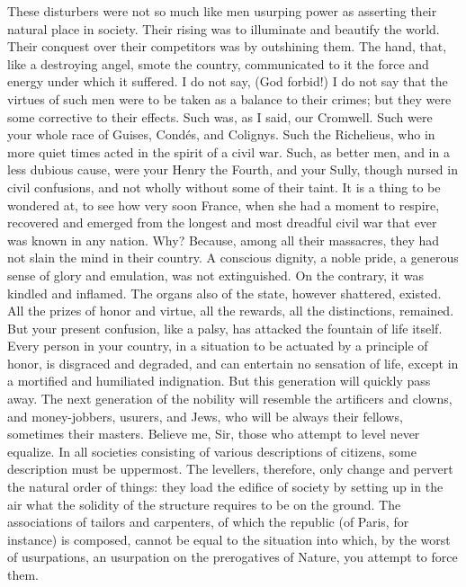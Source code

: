 These disturbers were not so much like men usurping power as asserting their natural place in society. Their rising was to illuminate and beautify the world. Their conquest over their competitors was by outshining them. The hand, that, like a destroying angel, smote the country, communicated to it the force and energy under which it suffered. I do not say, (God forbid!) I do not say that the virtues of such men were to be taken as a balance to their crimes; but they were some corrective to their effects. Such was, as I said, our Cromwell. Such were your whole race of Guises, Condés, and Colignys. Such the Richelieus, who in more quiet times acted in the spirit of a civil war. Such, as better men, and in a less dubious cause, were your Henry the Fourth, and your Sully, though nursed in civil confusions, and not wholly without some of their taint. It is a thing to be wondered at, to see how very soon France, when she had a moment to respire, recovered and emerged from the longest and most dreadful civil war that ever was known in any nation. Why? Because, among all their massacres, they had not slain the mind in their country. A conscious dignity, a noble pride, a generous sense of glory and emulation, was not extinguished. On the contrary, it was kindled and inflamed. The organs also of the state, however shattered, existed. All the prizes of honor and virtue, all the rewards, all the distinctions, remained. But your present confusion, like a palsy, has attacked the fountain of life itself. Every person in your country, in a situation to be actuated by a principle of honor, is disgraced and degraded, and can entertain no sensation of life, except in a mortified and humiliated indignation. But this generation will quickly pass away. The next generation of the nobility will resemble the artificers and clowns, and money-jobbers, usurers, and Jews, who will be always their fellows, sometimes their masters. Believe me, Sir, those who attempt to level never equalize. In all societies consisting of various descriptions of citizens, some description must be uppermost. The levellers, therefore, only change and pervert the natural order of things: they load the edifice of society by setting up in the air what the solidity of the structure requires to be on the ground. The associations of tailors and carpenters, of which the republic (of Paris, for instance) is composed, cannot be equal to the situation into which, by the worst of usurpations, an usurpation on the prerogatives of Nature, you attempt to force them.

